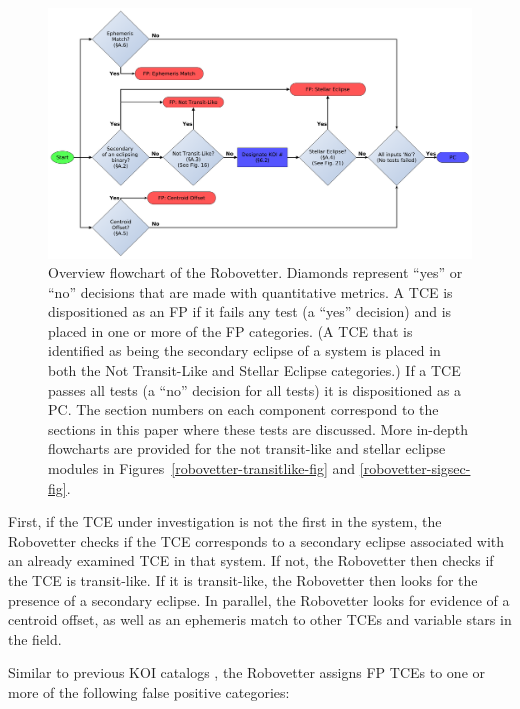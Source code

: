 \begin{figure}[htb]
\centering
\includegraphics[width=\linewidth]{RoboVetter-Diagram-V4-Overview.pdf}
\caption{Overview flowchart of the Robovetter. Diamonds represent ``yes'' or ``no'' decisions that are made with quantitative metrics. A TCE is dispositioned as an FP if it fails any test (a ``yes'' decision) and is placed in one or more of the FP categories. (A TCE that is identified as being the secondary eclipse of a system is placed in both the Not Transit-Like and Stellar Eclipse categories.) If a TCE passes all tests (a ``no'' decision for all tests) it is dispositioned as a PC. The section numbers on each component correspond to the sections in this paper where these tests are discussed. More in-depth flowcharts are provided for the not transit-like and stellar eclipse modules in Figures~\ref{robovetter-transitlike-fig} and \ref{robovetter-sigsec-fig}.}
\label{robovetter-overview-fig}
\end{figure}


First, if the TCE under investigation is not the first in the system, the Robovetter checks if the TCE corresponds to a secondary eclipse associated with an already examined TCE in that system. If not, the Robovetter then checks if the TCE is transit-like. If it is transit-like, the Robovetter then looks for the presence of a secondary eclipse. In parallel, the Robovetter looks for evidence of a centroid offset, as well as an ephemeris match to other TCEs and variable stars in the \kepler{} field. 

\label{s:majorflags}
Similar to previous KOI catalogs \citep{Coughlin2016, Mullally2015cat, Rowe2015cat}, the Robovetter assigns FP TCEs to one or more of the following false positive categories:


